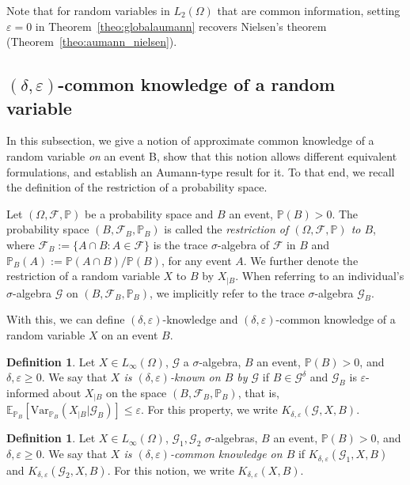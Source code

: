 \documentclass[a4paper, 10pt]{article}
\numberwithin{theorem}{section}
\theoremstyle{definition}
\newtheorem{definition}[theorem]{Definition}
\newcommand{\E}{\mathbb{E}}
\newcommand{\F}{\mathcal{F}}
\newcommand{\G}{\mathcal{G}}
\newcommand{\Var}{\mathrm{Var}}
\renewcommand{\epsilon}{\varepsilon}
\renewcommand{\P}{\mathbb{P}}
\begin{document}
Note that for random variables in $L_2(\Omega)$ that are common information, setting $\epsilon=0$ in Theorem~\ref{theo:globalaumann} recovers Nielsen's theorem (Theorem~\ref{theo:aumann_nielsen}).

\vspace{10pt}




\boldmath
\subsection{$(\delta,\epsilon)$-common knowledge of a random variable}\label{section: delta-epsilon-X}
\unboldmath

In this subsection, we give a notion of approximate common knowledge of a random variable \emph{on} an event B, show that this notion allows different equivalent formulations, and establish an Aumann-type result for it. To that end, we recall the definition of the restriction of a probability space. 



\medskip
Let $(\Omega, \F, \P)$ be a probability space and $B$ an event, $\P(B)>0$. The probability space  $(B, \F_B, \P_B)$ is called the \emph{restriction of  $(\Omega, \F, \P)$ to $B$}, where $\F_B := \{ A \cap B : A \in \F \}$ is the trace $\sigma$-algebra of $\F$ in $B$ and ${\P_B(A):=\P(A\cap B)/\P(B)}$, for any event $A$. We further denote the restriction of a random variable $X$ to $B$ by $X_{|B}$. When referring to an individual's $\sigma$-algebra $\G$ on $(B, \F_B, \P_B)$, we implicitly refer to the trace $\sigma$-algebra $\G_B$.   
\medskip


With this, we can define $(\delta,\epsilon)$-knowledge and $(\delta,\epsilon)$-common knowledge of a random variable $X$ on an event $B$.   

\begin{definition}
	Let $X\in L_\infty(\Omega)$, $\G$ a $\sigma$-algebra, $B$ an event, $\P(B)>0$, and $\delta, \epsilon \geq 0$. We say that \emph{$X$ is $(\delta,\epsilon)$-known on $B$ by $\G$} if $B \in \G^\delta$ and $\G_{B}$ is $\epsilon$-informed about $X_{|B}$ on the space $(B, \F_B, \P_B)$, that is, $\E_{\P_B}[\Var_{\P_B}(X_{|B}|\G_{B})]\leq \epsilon$.
	For this property, we write $K_{ \delta, \epsilon}(\G, X, B).$
\end{definition}

\begin{definition}\label{def-X-deCK}
	Let $X\in L_\infty(\Omega)$, $\G_1, \G_2$  $\sigma$-algebras, $B$ an event, $\P(B)>0$, and $\delta, \epsilon \geq 0$. We say that \emph{$X$ is $(\delta,\epsilon)$-common knowledge on $B$} if $K_{\delta,\epsilon}(\G_1, X, B)$ and $K_{\delta,\epsilon}(\G_2, X, B).$
	For this notion, we write $K_{\delta,\epsilon}( X, B).$
	
\end{definition}
\end{document}
